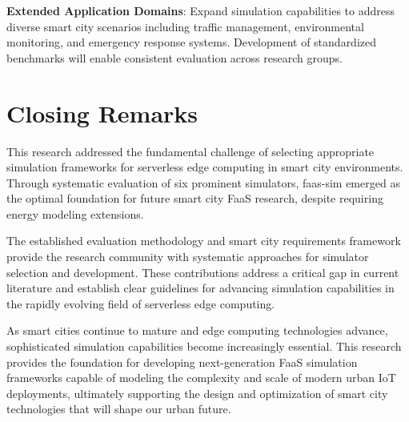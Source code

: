 \textbf{Extended Application Domains}: Expand simulation capabilities to address diverse smart city scenarios including traffic management, environmental monitoring, and emergency response systems. Development of standardized benchmarks will enable consistent evaluation across research groups.

\section{Closing Remarks}

This research addressed the fundamental challenge of selecting appropriate simulation frameworks for serverless edge computing in smart city environments. Through systematic evaluation of six prominent simulators, faas-sim emerged as the optimal foundation for future smart city FaaS research, despite requiring energy modeling extensions.

The established evaluation methodology and smart city requirements framework provide the research community with systematic approaches for simulator selection and development. These contributions address a critical gap in current literature and establish clear guidelines for advancing simulation capabilities in the rapidly evolving field of serverless edge computing.

As smart cities continue to mature and edge computing technologies advance, sophisticated simulation capabilities become increasingly essential. This research provides the foundation for developing next-generation FaaS simulation frameworks capable of modeling the complexity and scale of modern urban IoT deployments, ultimately supporting the design and optimization of smart city technologies that will shape our urban future.